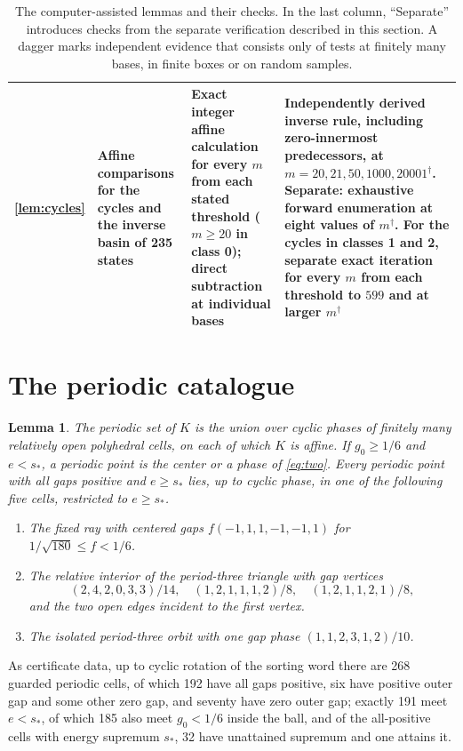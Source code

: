 \documentclass[11pt,reqno]{amsart}
\newtheorem{lemma}[theorem]{Lemma}
\theoremstyle{remark}
\begin{document}
\begin{table}[htbp]
\begin{tabular}{@{}>{\raggedright\arraybackslash}p{1.5cm}>{\raggedright\arraybackslash}p{3.1cm}>{\raggedright\arraybackslash}p{4.1cm}>{\raggedright\arraybackslash}p{5.95cm}@{}}
\ref{lem:cycles} & Affine comparisons for the cycles and the inverse basin of 235 states & Exact integer affine calculation for every \(m\) from each stated threshold (\(m\ge20\) in class 0); direct subtraction at individual bases & Independently derived inverse rule, including zero-innermost predecessors, at \(m=20,21,50,1000,20001\)\(^\dagger\). Separate: exhaustive forward enumeration at eight values of \(m\)\(^\dagger\). For the cycles in classes 1 and 2, separate exact iteration for every \(m\) from each threshold to \(599\) and at larger \(m\)\(^\dagger\)\\
\hline
\end{tabular}
\caption{The computer-assisted lemmas and their checks. In the last column, ``Separate'' introduces checks from the separate verification described in this section. A dagger marks independent evidence that consists only of tests at finitely many bases, in finite boxes or on random samples.}
\label{tab:checks}
\end{table}

\appendix
\section{The periodic catalogue}\label{ap:catalogue}

\begin{lemma}\label{lem:catalogue}
The periodic set of \(K\) is the union over cyclic phases of finitely many relatively open polyhedral cells, on each of which \(K\) is affine. If \(g_0\ge1/6\) and \(e<s_*\), a periodic point is the center or a phase of \eqref{eq:two}. Every periodic point with all gaps positive and \(e\ge s_*\) lies, up to cyclic phase, in one of the following five cells, restricted to \(e\ge s_*\).
\begin{enumerate}
\item The fixed ray with centered gaps \(f(-1,1,1,-1,-1,1)\) for \(1/\sqrt{180}\le f<1/6\).
\item The relative interior of the period-three triangle with gap vertices
\[
 (2,4,2,0,3,3)/14,\quad (1,2,1,1,1,2)/8,\quad (1,2,1,1,2,1)/8,
\]
and the two open edges incident to the first vertex.
\item The isolated period-three orbit with one gap phase \((1,1,2,3,1,2)/10\).
\end{enumerate}
\end{lemma}

As certificate data, up to cyclic rotation of the sorting word there are 268 guarded periodic cells, of which 192 have all gaps positive, six have positive outer gap and some other zero gap, and seventy have zero outer gap; exactly 191 meet \(e<s_*\), of which 185 also meet \(g_0<1/6\) inside the ball, and of the all-positive cells with energy supremum \(s_*\), 32 have unattained supremum and one attains it.
\end{document}
